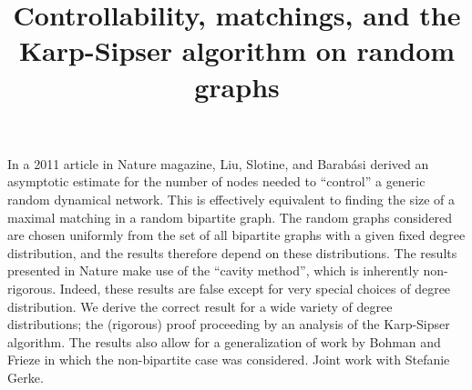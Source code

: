 \title{Controllability, matchings, and the Karp-Sipser algorithm on random graphs}
\endtitle
In a 2011 article in Nature magazine, Liu, Slotine, and Barabási derived an asymptotic estimate for the number of nodes needed to ``control'' a generic random dynamical network. This is effectively equivalent to finding the size of a maximal matching in a random bipartite graph. The random graphs considered are chosen uniformly from the set of all bipartite graphs with a given fixed degree distribution, and the results therefore depend on these distributions. The results presented in Nature make use of the ``cavity method'', which is inherently non-rigorous. Indeed, these results are false except for very special choices of degree distribution. We derive the correct result for a wide variety of degree distributions; the (rigorous) proof proceeding by an analysis of the Karp-Sipser algorithm. The results also allow for a generalization of work by Bohman and Frieze in which the non-bipartite case was considered. 
Joint work with Stefanie Gerke.
